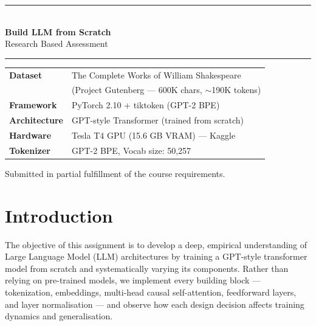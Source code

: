 \documentclass[12pt,a4paper]{article}
\begin{document}

\begin{titlepage}
  \centering
  \vspace*{1.5cm}

  {\color{navyblue}\rule{\linewidth}{2pt}}\\[0.4cm]
  {\Huge\bfseries\color{navyblue} Build LLM from Scratch}\\[0.3cm]
  {\large\color{accentblue} Research Based Assessment}\\[0.1cm]
  {\color{navyblue}\rule{\linewidth}{2pt}}

  \vspace{1.5cm}

  \begin{tcolorbox}[colback=lightblue, colframe=navyblue, boxrule=0.8pt,
                    left=12pt, right=12pt, top=8pt, bottom=8pt]
    \centering
    \begin{tabular}{ll}
      \textbf{Dataset}    & The Complete Works of William Shakespeare\\
                          & (Project Gutenberg — 600K chars, $\sim$190K tokens)\\[4pt]
      \textbf{Framework}  & PyTorch 2.10 + tiktoken (GPT-2 BPE)\\[4pt]
      \textbf{Architecture} & GPT-style Transformer (trained from scratch)\\[4pt]
      \textbf{Hardware}   & Tesla T4 GPU (15.6 GB VRAM) — Kaggle\\[4pt]
      \textbf{Tokenizer}  & GPT-2 BPE, Vocab size: 50,257\\
    \end{tabular}
  \end{tcolorbox}

  \vspace{1cm}
  \tableofcontents

  \vfill
  {\small\color{gray} Submitted in partial fulfillment of the course requirements.}
\end{titlepage}

\section{Introduction}

The objective of this assignment is to develop a deep, empirical understanding of Large Language Model (LLM) architectures by training a GPT-style transformer model from scratch and systematically varying its components. Rather than relying on pre-trained models, we implement every building block — tokenization, embeddings, multi-head causal self-attention, feedforward layers, and layer normalisation — and observe how each design decision affects training dynamics and generalisation.
\end{document}
